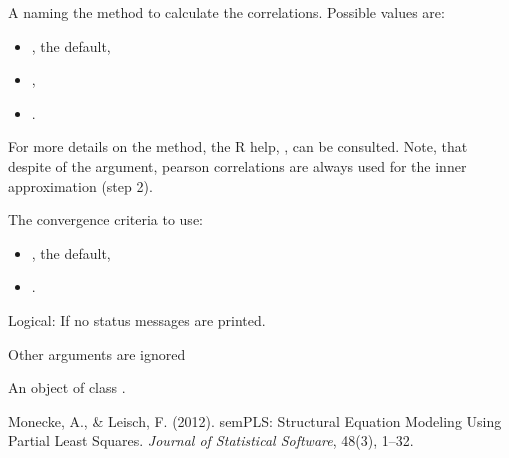\documentclass[a4paper]{book}
\begin{document}
\begin{Arguments}
\begin{ldescription}
\item[\code{method}] A  naming the method to calculate
the correlations. Possible values are:
\begin{itemize}

\item{}  , the default,
\item{} ,
\item{} .

\end{itemize}

For more details on the method, the R help, , can be
consulted. Note, that despite of the  argument, pearson
correlations are always used for the inner approximation (step 2).


\item[\code{convCrit}] 
The convergence criteria to use:
\begin{itemize}

\item{} , the default,
\item{} .

\end{itemize}



\item[\code{verbose}] 
Logical: If  no status messages are printed.


\item[\code{...}] Other arguments are ignored
\end{ldescription}
\end{Arguments}
%
\begin{Value}
An object of class .
\end{Value}
%
\begin{References}\relax
Monecke, A., \& Leisch, F. (2012). semPLS: Structural Equation Modeling Using Partial Least Squares. \emph{Journal of Statistical Software}, 48(3), 1–32.
\end{References}
%
\begin{SeeAlso}\relax
{}
\end{SeeAlso}
%
\end{document}
